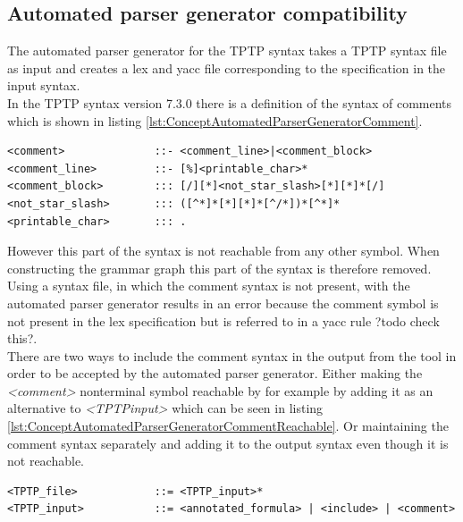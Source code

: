 \subsection{Automated parser generator compatibility}\label{sec:ConceptAutomatedParserGenerator}
The automated parser generator for the \ac{TPTP} syntax \cite{VS06} takes a \ac{TPTP} syntax file as input and creates a lex and yacc file corresponding to the specification in the input syntax.\\
In the \ac{TPTP} syntax version 7.3.0 there is a definition of the syntax of comments which is shown in listing \ref{lst:ConceptAutomatedParserGeneratorComment}.
\begin{lstlisting}[language=none, basicstyle=\scriptsize, caption=Comment syntax definition in the \ac{TPTP} syntax, label= lst:ConceptAutomatedParserGeneratorComment]
<comment>              ::- <comment_line>|<comment_block> 
<comment_line>         ::- [%]<printable_char>*
<comment_block>        ::: [/][*]<not_star_slash>[*][*]*[/]
<not_star_slash>       ::: ([^*]*[*][*]*[^/*])*[^*]*
<printable_char>       ::: .
\end{lstlisting}

However this part of the syntax is not reachable from any other symbol.
When constructing the grammar graph this part of the syntax is therefore removed.\\
Using a syntax file, in which the comment syntax is not present, with the automated parser generator results in an error because the comment symbol is not present in the lex specification but is referred to in a yacc rule ?todo check this?.\\
There are two ways to include the comment syntax in the output from the tool in order to be accepted by the automated parser generator.
Either making the \textit{<comment>} nonterminal symbol reachable by for example by adding it as an alternative to \textit{<TPTP\textunderscore input>} which can be seen in listing \ref{lst:ConceptAutomatedParserGeneratorCommentReachable}.
Or maintaining the comment syntax separately and adding it to the output syntax even though it is not reachable.
\begin{lstlisting}[language=none, basicstyle=\scriptsize, caption=Making the comment syntax reachable, label= lst:ConceptAutomatedParserGeneratorCommentReachable]
<TPTP_file>            ::= <TPTP_input>*
<TPTP_input>           ::= <annotated_formula> | <include> | <comment>
\end{lstlisting}

